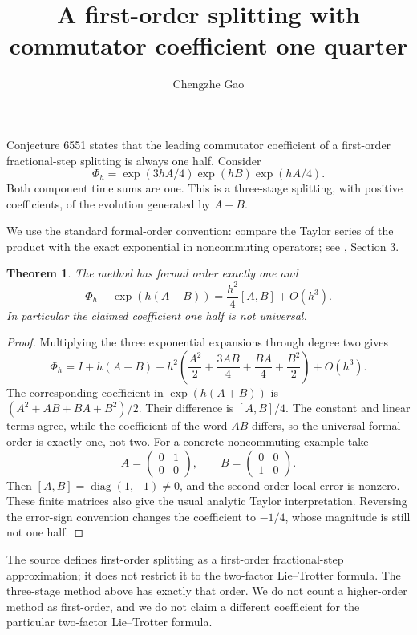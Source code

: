 \documentclass[11pt]{article}
\newtheorem{theorem}{Theorem}
\begin{document}
\title{A first-order splitting with commutator coefficient one quarter}
\author{Chengzhe Gao}\date{}\maketitle
Conjecture 6551 states that the leading commutator coefficient of a
first-order fractional-step splitting is always one half. Consider
\[
 \Phi_h=\exp(3hA/4)\exp(hB)\exp(hA/4).
\]
Both component time sums are one. This is a three-stage splitting, with
positive coefficients, of the evolution generated by $A+B$.

We use the standard formal-order convention: compare the Taylor series
of the product with the exact exponential in noncommuting operators;
see \cite{BCM}, Section 3.

\begin{theorem}
The method has formal order exactly one and
\[
 \Phi_h-\exp(h(A+B))=\frac{h^2}{4}[A,B]+O(h^3).
\]
In particular the claimed coefficient one half is not universal.
\end{theorem}
\begin{proof}
Multiplying the three exponential expansions through degree two gives
\[
 \Phi_h=I+h(A+B)+h^2\left(
 \frac{A^2}{2}+\frac{3AB}{4}+\frac{BA}{4}+\frac{B^2}{2}\right)+O(h^3).
\]
The corresponding coefficient in $\exp(h(A+B))$ is
$(A^2+AB+BA+B^2)/2$. Their difference is $[A,B]/4$.
The constant and linear terms agree, while the coefficient of the word
$AB$ differs, so the universal formal order is exactly one, not two.
For a concrete noncommuting example take
\[
 A=\begin{pmatrix}0&1\\0&0\end{pmatrix},\qquad
 B=\begin{pmatrix}0&0\\1&0\end{pmatrix}.
\]
Then $[A,B]=\operatorname{diag}(1,-1)\ne0$, and the second-order local
error is nonzero. These finite matrices also give the usual analytic
Taylor interpretation. Reversing the error-sign convention changes the
coefficient to $-1/4$, whose magnitude is still not one half.
\end{proof}

The source defines first-order splitting as a first-order fractional-step
approximation; it does not restrict it to the two-factor Lie--Trotter
formula. The three-stage method above has exactly that order. We do not
count a higher-order method as first-order, and we do not claim a different
coefficient for the particular two-factor Lie--Trotter formula.
\end{document}
